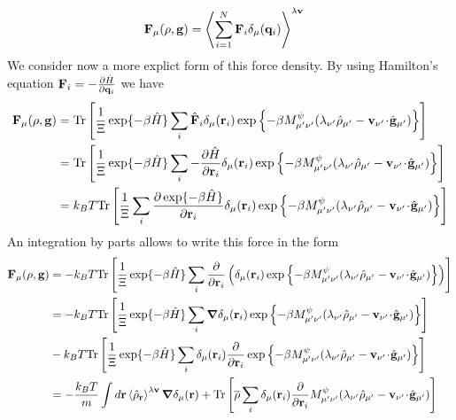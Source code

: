 \documentclass[b5paper,openright,10pt]{book}
\newcommand{\esc}{\!\cdot\!}
\newcommand{\llangle}{\left\langle}
\newcommand{\rrangle}{\right\rangle}
\begin{document}
\begin{appendices}
\begin{align}
{\bf F}_\mu(\rho,{\bf g})&=    \llangle \sum_{i=1}^N{\bf F}_i\delta_\mu({\bf q}_i)\rrangle^{\lambda{\bf v}}
\label{Kmuexact}
\end{align}
We consider now a more explict form of this force density. By using Hamilton's equation ${\bf F}_i=-\frac{\partial \hat{H}}{\partial {\bf q}_i}$ we have
\begin{align}
{\bf F}_\mu(\rho,{\bf g})&=  {\rm Tr}\left[\frac{1}{\Xi}\exp\{-\beta \hat{H}\}
\sum_i\hat{\bf F}_i\delta_\mu({\bf r}_i)
\exp\left\{-\beta M^\psi_{\mu'\nu'}(\lambda_{\nu'}\hat{\rho}_{\mu'}-{\bf v}_{\nu'}\esc\hat{\bf g}_{\mu'})\right\}
\right]
\nonumber\\
&=
{\rm Tr}\left[\frac{1}{\Xi}\exp\{-\beta \hat{H}\}
  \sum_i-\frac{\partial \hat{H}}{\partial {\bf r}_i}\delta_\mu({\bf r}_i)\exp\left\{-\beta M^\psi_{\mu'\nu'}(\lambda_{\nu'}\hat{\rho}_{\mu'}-{\bf v}_{\nu'}\esc\hat{\bf g}_{\mu'})\right\}
\right]
\nonumber\\
&= k_BT {\rm Tr}\left[\frac{1}{\Xi}
\sum_i\frac{\partial \exp\{-\beta \hat{H}\}}{\partial {\bf r}_{i}}\delta_\mu({\bf r}_i)\exp\left\{-\beta M^\psi_{\mu'\nu'}(\lambda_{\nu'}\hat{\rho}_{\mu'}-{\bf v}_{\nu'}\esc\hat{\bf g}_{\mu'})\right\}
\right]
\end{align}
An integration by parts allows to write this force in the form
\begin{align}
{\bf F}_\mu(\rho,{\bf g})
&= -k_BT {\rm Tr}\left[\frac{1}{\Xi}\exp\{-\beta \hat{H}\}
\sum_i\frac{\partial }{\partial {\bf r}_i}\left(\delta_\mu({\bf r}_i)\exp\left\{-\beta M^\psi_{\mu'\nu'}(\lambda_{\nu'}\hat{\rho}_{\mu'}-{\bf v}_{\nu'}\esc\hat{\bf g}_{\mu'})\right\}
\right)
\right]
\nonumber\\
&= -k_BT {\rm Tr}\left[\frac{1}{\Xi}\exp\{-\beta \hat{H}\}
\sum_i\boldsymbol{\nabla}\delta_\mu({\bf r}_i)\exp\left\{-\beta M^\psi_{\mu'\nu'}(\lambda_{\nu'}\hat{\rho}_{\mu'}-{\bf v}_{\nu'}\esc\hat{\bf g}_{\mu'})\right\}
\right]
\nonumber\\
& -k_BT {\rm Tr}\left[\frac{1}{\Xi}\exp\{-\beta \hat{H}\}
\sum_i\delta_\mu({\bf r}_i)\frac{\partial }{\partial {\bf r}_i}
\exp\left\{-\beta M^\psi_{\mu'\nu'}(\lambda_{\nu'}\hat{\rho}_{\mu'}-{\bf v}_{\nu'}\esc\hat{\bf g}_{\mu'})\right\}
\right]
\nonumber\\
&= -\frac{k_BT}{m}\int d{\bf r}\llangle\hat{\rho}_{\bf r}\rrangle^{\lambda{\bf v}}
\boldsymbol{\nabla}\delta_\mu({\bf r})
 + {\rm Tr}\left[\overline{\rho}
\sum_i\delta_\mu({\bf r}_i)
\frac{\partial }{\partial {\bf r}_i}
M^\psi_{\mu'\nu'}(\lambda_{\nu'}\hat{\rho}_{\mu'}-{\bf v}_{\nu'}\esc\hat{\bf g}_{\mu'})\right]

\end{align}
\end{appendices}
\end{document}
